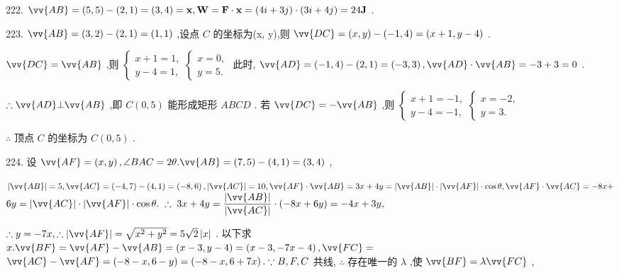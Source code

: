 222. $\vv{AB} = \left( {5,5}\right)  - \left( {2,1}\right)  = \left( {3,4}\right)  = \mathbf{x},\mathbf{W} = \mathbf{F} \cdot  \mathbf{x} = \left( {{4i} + {3j}}\right)  \cdot  \left( {{3i} + {4j}}\right)  = {24}\mathbf{J}$ .

223. $\vv{AB} = \left( {3,2}\right)  - \left( {2,1}\right)  = \left( {1,1}\right)$ ,设点 $C$ 的坐标为(x, y),则 $\vv{DC} = \left( {x,y}\right)  - \left( {-1,4}\right)  = \left( {x + 1,y - 4}\right)$ .

$\vv{DC} = \vv{AB}$ ,则 $\left\{  \begin{array}{l} x + 1 = 1, \\  y - 4 = 1, \end{array}\right. \left\{  \begin{array}{l} x = 0, \\  y = 5. \end{array}\right.$ 此时, $\vv{AD} = \left( {-1,4}\right)  - \left( {2,1}\right)  = \left( {-3,3}\right) ,\vv{AD} \cdot  \vv{AB} =  - 3 + 3 = 0$ .

$\therefore \vv{AD}\bot \vv{AB}$ ,即 $C\left( {0,5}\right)$ 能形成矩形 ${ABCD}$ . 若 $\vv{DC} =  - \vv{AB}$ ,则 $\left\{  {\begin{array}{l} x + 1 =  - 1, \\  y - 4 =  - 1, \end{array}\left\{  \begin{array}{l} x =  - 2, \\  y = 3. \end{array}\right. }\right.$

$\therefore$ 顶点 $C$ 的坐标为 $C\left( {0,5}\right)$ .

224. 设 $\vv{AF} = \left( {x,y}\right) ,\angle {BAC} = {2\theta }.\vv{AB} = \left( {7,5}\right)  - \left( {4,1}\right)  = \left( {3,4}\right)$ ,

$\left| \vv{AB}\right|  = 5,\vv{AC} = \left( {-4,7}\right)  - \left( {4,1}\right)  = \left( {-8,6}\right) ,\left| \vv{AC}\right|  = {10},\vv{AF} \cdot  \vv{AB} = {3x} + {4y} = \left| \vv{AB}\right|  \cdot  \left| \vv{AF}\right|  \cdot  \cos \theta ,\vv{AF} \cdot  \vv{AC} =  - {8x} +$  ${6y} = \left| \vv{AC}\right|  \cdot  \left| \vv{AF}\right|  \cdot  \cos \theta .\;\therefore \;{3x} + {4y} = \dfrac{\left| \vv{AB}\right| }{\left| \vv{AC}\right| } \cdot  \left( {-{8x} + {6y}}\right)  =  - {4x} + {3y},$

$\therefore y =  - {7x},\therefore \left| \vv{AF}\right|  = \sqrt{{x}^{2} + {y}^{2}} = 5\sqrt{2}\left| x\right|$ . 以下求 $x.\vv{BF} = \vv{AF} - \vv{AB} = \left( {x - 3,y - 4}\right)  = \left( {x - 3, - {7x} - 4}\right) ,\vv{FC} =$  $\vv{AC} - \vv{AF} = \left( {-8 - x,6 - y}\right)  = \left( {-8 - x,6 + {7x}}\right) .\because B,F,C$ 共线, $\therefore$ 存在唯一的 $\lambda$ ,使 $\vv{BF} = \lambda \vv{FC}$ ,

